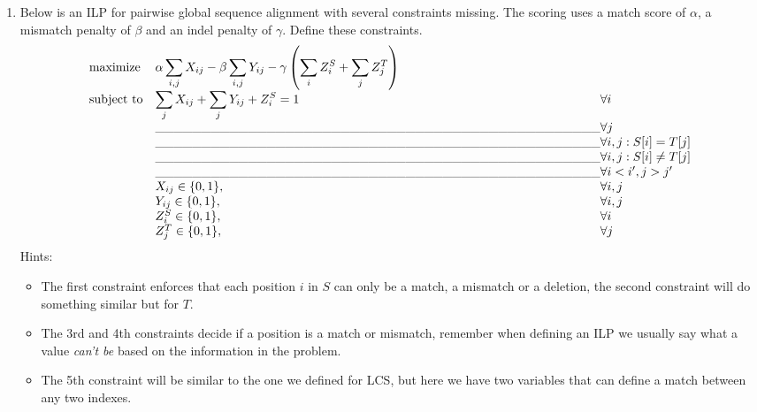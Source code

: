 \documentclass[11pt, oneside]{article}   	%
\begin{document}
\begin{enumerate}
\clearpage 
\item Below is an ILP for pairwise global sequence alignment with several constraints missing. 
The scoring uses a match score of $\alpha$, a mismatch penalty of $\beta$ and an indel penalty of $\gamma$. 
Define these constraints. 
\renewcommand{\arraystretch}{2}
\begin{equation*}
\begin{array}{ll@{}ll}
\text{maximize}  & \displaystyle\alpha \sum_{i,j} X_{ij} - \beta \sum_{i,j} Y_{ij} - \gamma \left(\sum_i Z^S_i + \sum_j Z^T_j\right) \\
\text{subject to}& \displaystyle\sum_j X_{ij} + \sum_j Y_{ij} + Z^S_i  = 1 & \forall i\\
			& \text{\_\_\_\_\_\_\_\_\_\_\_\_\_\_\_\_\_\_\_\_\_\_\_\_\_\_\_\_\_\_\_\_\_\_\_\_\_\_\_\_\_\_\_\_\_\_\_\_}& \forall j\\
			& \text{\_\_\_\_\_\_\_\_\_\_\_\_\_\_\_\_\_\_\_\_\_\_\_\_\_\_\_\_\_\_\_\_\_\_\_\_\_\_\_\_\_\_\_\_\_\_\_\_}& \forall i,j: S[i] =T[j]\\
			& \text{\_\_\_\_\_\_\_\_\_\_\_\_\_\_\_\_\_\_\_\_\_\_\_\_\_\_\_\_\_\_\_\_\_\_\_\_\_\_\_\_\_\_\_\_\_\_\_\_}& \forall i,j: S[i] \ne T[j]\\
			& \text{\_\_\_\_\_\_\_\_\_\_\_\_\_\_\_\_\_\_\_\_\_\_\_\_\_\_\_\_\_\_\_\_\_\_\_\_\_\_\_\_\_\_\_\_\_\_\_\_}& \forall i < i', j > j'\\
			& X_{ij} \in \{0,1\}, & \forall i,j\\
			& Y_{ij} \in \{0,1\}, & \forall i,j\\
			& Z^S_i \in \{0,1\}, & \forall i\\
			& Z^T_j \in \{0,1\}, & \forall j\\
\end{array}
\end{equation*}
Hints: 
\begin{itemize}
\item The first constraint enforces that each position $i$ in $S$ can only be a match, a mismatch or a deletion, the second constraint will do something similar but for $T$. 
\item The 3rd and 4th constraints decide if a position is a match or mismatch, remember when defining an ILP we usually say what a value \textit{can't be} based on the information in the problem. 
\item The 5th constraint will be similar to the one we defined for LCS, but here we have two variables that can define a match between any two indexes. 
\end{itemize}


\end{enumerate}
\end{document}
